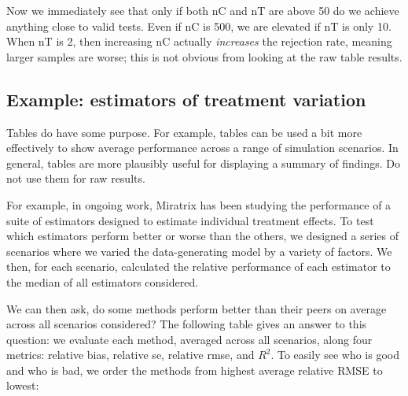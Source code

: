 \documentclass[
]{book}
\begin{document}
Now we immediately see that only if both nC and nT are above 50 do we achieve anything close to valid tests.
Even if nC is 500, we are elevated if nT is only 10. When nT is 2, then increasing nC actually \emph{increases} the rejection rate, meaning larger samples are worse; this is not obvious from looking at the raw table results.

\subsection{Example: estimators of treatment variation}\label{example-estimators-of-treatment-variation}

Tables do have some purpose.
For example, tables can be used a bit more effectively to show average performance across a range of simulation scenarios.
In general, tables are more plausibly useful for displaying a summary of findings. Do not use them for raw results.

For example, in ongoing work, Miratrix has been studying the performance of a suite of estimators designed to estimate individual treatment effects.
To test which estimators perform better or worse than the others, we designed a series of scenarios where we varied the data-generating model by a variety of factors.
We then, for each scenario, calculated the relative performance of each estimator to the median of all estimators considered.

We can then ask, do some methods perform better than their peers on average across all scenarios considered?
The following table gives an answer to this question: we evaluate each method, averaged across all scenarios, along four metrics: relative bias, relative se, relative rmse, and \(R^2\).
To easily see who is good and who is bad, we order the methods from highest average relative RMSE to lowest:
\end{document}
